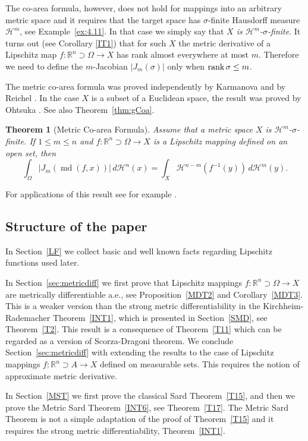 \documentclass[12pt,leqno]{amsart}
\newtheorem{theorem}{Theorem}
\theoremstyle{definition}
\newcommand{\bbbr}{\mathbb R}
\def\H{{\mathcal H}}
\def\rank{{\rm rank\,}}
\def\md{\operatorname{md}}
\numberwithin{theorem}{section} \numberwithin{equation}{section}
\begin{document}
The co-area formula, however, does not hold for mappings into an arbitrary metric space and it requires that the target space has $\sigma$-finite Hausdorff measure $\H^m$, see Example~\ref{ex:4.11}. In that case we simply say that {\em $X$ is $\H^m$-$\sigma$-finite}. It turns out (see Corollary \ref{IT1}) that for such $X$ the metric derivative of a Lipschitz map $f:\bbbr^n\supset\Omega\to X$ has rank almost everywhere at most $m$. Therefore we need to define the $m$-Jacobian $|J_m(\sigma)|$ only when $\rank\sigma\leq m$.

The metric co-area formula was proved independently by Karmanova \cite{kar} and by Reichel \cite{reichel}.  In the case $X$ is a subset of a Euclidean space, the result was proved by Ohtsuka \cite{ohtsuka}. See also Theorem~\ref{thm:gCoa}.
\begin{theorem}[Metric Co-area Formula]
\label{INT5}
Assume that a metric space $X$ is $\H^m$-$\sigma$-finite. If $1\leq m\leq n$ and $f:\bbbr^n\supset \Omega\to X$ is a Lipschitz mapping defined on an open set, then
$$
\int_\Omega |J_m (\md(f,x))|\, d\H^n(x)=\int_X\H^{n-m}(f^{-1}(y))\, d\H^m(y).
$$
\end{theorem}


For applications of this result see for example \cite{volume, hajlaszkk,KL}.

\subsection*{Structure of the paper}
In Section~\ref{LF} we collect basic and well known facts regarding Lipschitz functions used later.

In Section~\ref{sec:metricdiff} we first prove that Lipschitz mappings $f:\bbbr^n\supset\Omega\to X$ are metrically differentiable a.e., see Proposition~\ref{MDT2} and Corollary~\ref{MDT3}. This is a weaker version than the strong metric differentiability in the Kirchheim-Rademacher Theorem~\ref{INT1}, which is presented in Section~\ref{SMD}, see Theorem~\ref{T2}. This result is a consequence of Theorem~\ref{T11} which can be regarded as a version of Scorza-Dragoni theorem. We conclude Section~\ref{sec:metricdiff} with extending the results to the case of Lipschitz mappings $f:\bbbr^n\supset A\to X$ defined on measurable sets. This requires the notion of approximate metric derivative.

In Section~\ref{MST} we first prove the classical Sard Theorem~\ref{T15}, and then we prove the Metric Sard Theorem~\ref{INT6}, see Theorem~\ref{T17}. The Metric Sard Theorem is not a simple adaptation of the proof of Theorem~\ref{T15} and it requires the strong metric differentiability, Theorem~\ref{INT1}.
\end{document}
